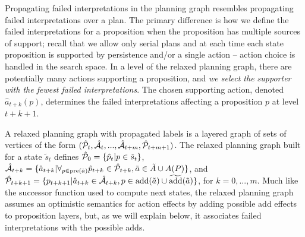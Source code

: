 \documentclass{article}
\def\und#1{\noindent{\bf #1}:}
\def\und#1{\medskip{\noindent\bf #1:}}
\begin{document}
\und{Incomplete Domain Heuristics} Propagating failed interpretations in the
planning graph resembles propagating failed interpretations over a plan.  The
primary difference is how we define the failed interpretations for a proposition
when the proposition has multiple sources of support; recall that we allow only
serial plans and at each time each state proposition is supported by persistence
and/or a single action -- action choice is handled in the search space. In a
level of the relaxed planning graph, there are potentially many actions
supporting a proposition, and {\em we select the supporter with the fewest
failed interpretations}. The chosen supporting action, denoted
$\hat{a}_{t+k}(p)$, determines the failed interpretations affecting a proposition $p$ at level
$t+k+1$.


A relaxed planning graph with propagated labels is a layered
graph of sets of vertices of the form $(\hat{\cal P}_t, \hat{\cal A}_t, ..., \hat{\cal
A}_{t+m}, \hat{\cal P}_{t+m+1})$. The relaxed planning graph built for a state $\tilde{s}_t$ defines $\hat{\cal P}_0 = \{\hat{p}_t | p \in \tilde{s}_t\}$, $\hat{\cal A}_{t+k} = \{ \hat{a}_{t+k} | \forall_{p \in \text{pre}(\tilde{a})} \hat{p}_{t+k} \in \hat{\cal P}_{t+k}, \tilde{a} \in \tilde{A} \cup A(P)\}$, and $\hat{\cal P}_{t+k+1} = \{p_{t+k+1} | \hat{a}_{t+k} \in \hat{\cal A}_{t+k}, p \in \text{add}(\tilde{a}) \cup \widetilde{\text{add}}(\tilde{a})\}$, for $k = 0, ..., m$.  Much like the successor function used to compute next states, the relaxed planning graph assumes an optimistic semantics for action effects by adding possible add effects to proposition layers, but, as we will explain below, it associates failed interpretations with the possible adds. 
\end{document}
